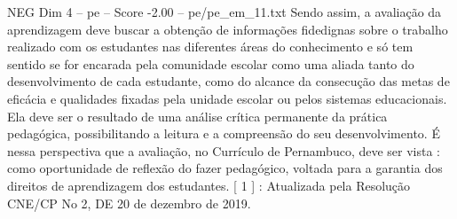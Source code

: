 \begin{textsample}{NEG Dim 4 – pe – Score -2.00 – pe/pe\_em\_11.txt}
Sendo assim, a avaliação da aprendizagem deve buscar a obtenção de informações fidedignas sobre o trabalho realizado com os estudantes nas diferentes áreas do conhecimento e só tem sentido se for encarada pela comunidade escolar como uma aliada tanto do desenvolvimento de cada estudante, como do alcance da consecução das metas de eficácia e qualidades fixadas pela unidade escolar ou pelos sistemas educacionais.
Ela deve ser o resultado de uma análise crítica permanente da prática pedagógica, possibilitando a leitura e a compreensão do seu desenvolvimento.
É nessa perspectiva que a avaliação, no Currículo de Pernambuco, deve ser vista : como oportunidade de reflexão do fazer pedagógico, voltada para a garantia dos direitos de aprendizagem dos estudantes. [ 1 ] : Atualizada pela Resolução CNE/CP No 2, DE 20 de dezembro de 2019.

\end{textsample}
